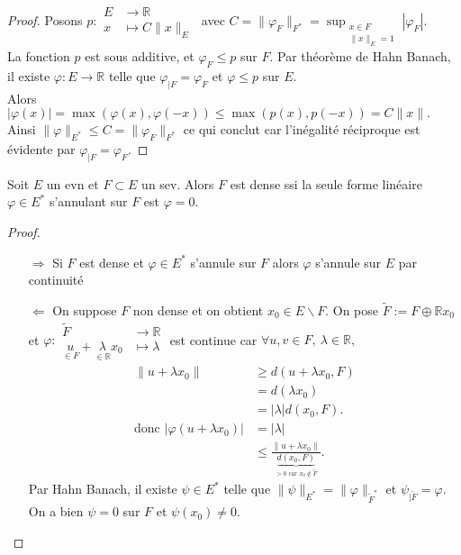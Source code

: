 \begin{proof}
    Posons $p :\begin{aligned}
        E &\longrightarrow \mathbb{R}  \\
        x &\longmapsto C\|x\|_E
    \end{aligned}$ avec $C=\|\varphi _F\|_{F^*}=\sup_{\substack{x\in F\\\|x\|_E=1}}|\varphi _F| .$ \\
    La fonction $p$ est sous additive, et $\varphi _F\le p$ sur $F.$ Par théorème de Hahn Banach, il existe $\varphi :E\to \mathbb{R} $ telle que $\varphi _{|F}=\varphi _F$ et $\varphi \le p$ sur $E.$\\
    Alors $|\varphi (x)| =\max\left( \varphi (x),\varphi (-x) \right) \le \max\left( p(x),p(-x) \right) =C\|x\|.$ \\
    Ainsi $\|\varphi \|_{E^*}\le C=\|\varphi _F\|_{F^*}$ ce qui conclut car l'inégalité réciproque est évidente par $\varphi _{|F}=\varphi _F.$
\end{proof}
\begin{corollaire}
    Soit $E$ un evn et $F\subset E$ un sev. Alors \hypertarget{crit-densite}{$F$ est dense ssi la seule forme linéaire $\varphi \in E^*$ s'annulant sur $F$ est $\varphi =0.$}
\end{corollaire}
\begin{proof}\par\noindent
    \begin{itemize}
        \item[$\Rightarrow$] Si $F$ est dense et $\varphi\in E^* $ s'annule sur $F$ alors $\varphi $ s'annule sur $E$ par continuité
        \item[$\Leftarrow$] On suppose $F$ non dense et on obtient $x_0\in E \backslash F$. On pose $\tilde{F}:=F\oplus \mathbb{R} x_0$ et $\varphi  :\begin{aligned}
            \tilde{F} &\longrightarrow \mathbb{R}  \\
            \underset{\in F}{u} + \underset{\in \mathbb{R} }{\lambda}x_0 &\longmapsto \lambda
        \end{aligned}$ est continue car $\forall u,v\in F,\ \lambda\in \mathbb{R} , $
        \begin{align*}
            \|u+\lambda x_0\|&\ge d(u+\lambda x_0, F)\\
                             &=d(\lambda x_0)\\
                             &= |\lambda| d(x_0,F).\\
            \text{donc } |\varphi (u+\lambda x_0)| &=|\lambda| \\
                                                   &\le \frac{\|u+\lambda x_0\|}{\underbrace{d(x_0,F)}_{>0 \text{ car }x_0\not\in \tilde{F} }}.
        \end{align*}
        Par Hahn Banach, il existe $\psi\in E^*$ telle que $\|\psi\|_{E^*}=\|\varphi \|_{\tilde{F}^*}$ et $\psi_{|\tilde{F}}=\varphi .$ On a bien $\psi=0$ sur $F$ et $\psi(x_0)\neq 0$.
    \end{itemize}

\end{proof}
